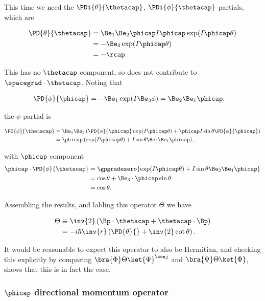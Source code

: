This time we need the $\PDi{\theta}{\thetacap}$, $\PDi{\phi}{\thetacap}$ partials, which are

\begin{align*}
\PD{\theta}{\thetacap} 
&=
\Be_1 \Be_2 \phicap I \phicap \exp( I \phicap \theta) \\
&=
-\Be_3 \exp( I \phicap \theta) \\
&=
- \rcap.
\end{align*}

This has no $\thetacap$ component, so does not contribute to $\spacegrad \cdot \thetacap$.  Noting that

\begin{align*}
\PD{\phi}{\phicap} &= -\Be_1 \exp( I \Be_3 \phi ) = \Be_2 \Be_1 \phicap,
\end{align*}

the $\phi$ partial is

\begin{align*}
\PD{\phi}{\thetacap} &=
\Be_1 \Be_2 \left( 
\PD{\phi}{\phicap} \exp( I \phicap \theta )
+\phicap I \sin\theta \PD{\phi}{\phicap} 
\right) \\
&=
\phicap 
\left( 
\exp( I \phicap \theta )
+I \sin\theta \Be_2 \Be_1 \phicap
\right),
\end{align*}

with $\phicap$ component
\begin{align*}
\phicap \cdot \PD{\phi}{\thetacap} &=
\gpgradezero{
\exp( I \phicap \theta )
+I \sin\theta \Be_2 \Be_1 \phicap } \\
&=
\cos\theta + \Be_3 \cdot \phicap \sin\theta \\
&=
\cos\theta.
\end{align*}

Assembling the results, and labling this operator $\Theta$ we have

\begin{align*}
\Theta &\equiv \inv{2} \left( \Bp \cdot \thetacap + \thetacap \cdot \Bp \right)  \\
&=
-i \hbar \inv{r} \left( \PD{\theta}{} + \inv{2} \cot\theta \right).
\end{align*}

It would be reasonable to expect this operator to also be Hermitian, and checking this explicitly by comparing
$\bra{\Phi} \Theta \ket{\Psi}^\conj$ and $\bra{\Psi} \Theta \ket{\Phi}$, shows that this is in fact the case.

\subsubsection{$\phicap$ directional momentum operator}

